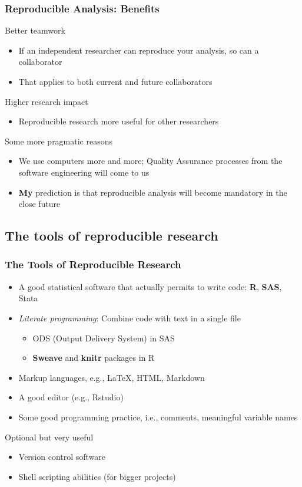 \documentclass[paper=screen,mathserif]{beamer}\usepackage[]{graphicx}\usepackage[]{color}
\begin{document}
\begin{frame}
  \frametitle{Reproducible Analysis: Benefits}
  Better teamwork
  \begin{itemize}
  \item If an independent researcher can reproduce your analysis, so
    can a collaborator
  \item That applies to both current and future collaborators
  \end{itemize}
  Higher research impact
  \begin{itemize}
  \item Reproducible research more useful for other researchers
  \end{itemize}\pause
  Some more pragmatic reasons
  \begin{itemize}
  \item We use computers more and more; Quality Assurance processes
    from the software engineering will come to us
  \item {\bf My} prediction is that reproducible analysis will become
    mandatory in the close future
  \end{itemize}
\end{frame}

\subsection{The tools of reproducible research}

\begin{frame}
  \frametitle{The Tools of Reproducible Research}
  \begin{itemize}
  \item A good statistical software that actually permits to write
    code: {\bf R}, {\bf SAS}, Stata
  \item {\em Literate programming}: Combine code with text in a single
    file
    \begin{itemize}
    \item ODS (Output Delivery System) in SAS
    \item {\bf Sweave} and {\bf knitr} packages in R
    \end{itemize}
  \item Markup languages, e.g., \LaTeX, HTML, Markdown
  \item A good editor (e.g., Rstudio)
  \item Some good programming practice, i.e., comments, meaningful
    variable names
  \end{itemize}\pause
  Optional but very useful
  \begin{itemize}
  \item Version control software
  \item Shell scripting abilities (for bigger projects)
  \end{itemize}
\end{frame}
\end{document}
